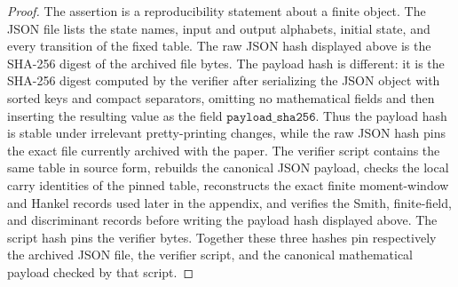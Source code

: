 \begin{proof}
The assertion is a reproducibility statement about a finite object.  The JSON
file lists the state names, input and output alphabets, initial state, and every
transition of the fixed table.  The raw JSON hash displayed above is the
SHA-256 digest of the archived file bytes.  The payload hash is different: it is
the SHA-256 digest computed by the verifier after serializing the JSON object
with sorted keys and compact separators, omitting no mathematical fields and
then inserting the resulting value as the field
\(\texttt{payload\_sha256}\).  Thus the payload hash is stable under
irrelevant pretty-printing changes, while the raw JSON hash pins the exact file
currently archived with the paper.  The verifier script contains the same table
in source form, rebuilds the canonical JSON payload, checks the local carry
identities of the pinned table, reconstructs the exact finite moment-window and
Hankel records used later in the appendix, and verifies the Smith,
finite-field, and discriminant records before writing the payload hash
displayed above.  The script hash pins the verifier bytes.  Together these
three hashes pin respectively the archived JSON file, the verifier script, and
the canonical mathematical payload checked by that script.
\end{proof}

